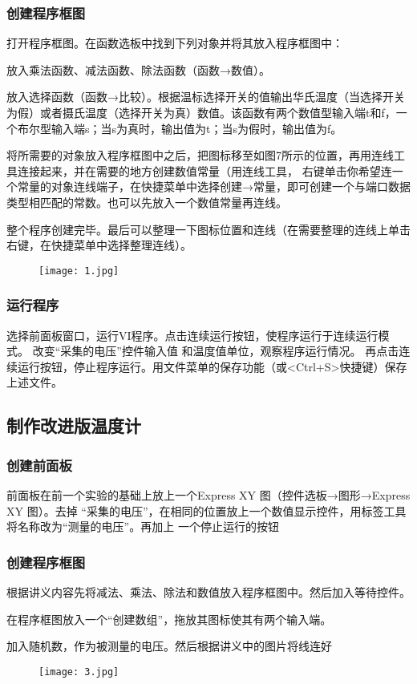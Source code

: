 \documentclass[12pt,a4paper]{article}
\begin{document}
    \subsubsection{创建程序框图}
    打开程序框图。在函数选板中找到下列对象并将其放入程序框图中：\par
    放入乘法函数、减法函数、除法函数（函数→数值）。\par
    放入选择函数（函数→比较）。根据温标选择开关的值输出华氏温度（当选择开关为假）或者摄氏温度（选择开关为真）数值。该函数有两个数值型输入端t和f，一个布尔型输入端s；当s为真时，输出值为t；当s为假时，输出值为f。\par
    将所需要的对象放入程序框图中之后，把图标移至如图7所示的位置，再用连线工具连接起来，并在需要的地方创建数值常量（用连线工具，
    右键单击你希望连一个常量的对象连线端子，在快捷菜单中选择创建→常量，即可创建一个与端口数据类型相匹配的常数。也可以先放入一个数值常量再连线。\par
    整个程序创建完毕。最后可以整理一下图标位置和连线（在需要整理的连线上单击右键，在快捷菜单中选择整理连线）。\par
    
    \begin{figure}[H]
        \centering
        \texttt{[image: 1.jpg]}
    \end{figure}
    \subsubsection{运行程序}
    选择前面板窗口，运行VI程序。点击连续运行按钮，使程序运行于连续运行模式。
    改变“采集的电压”控件输入值
    和温度值单位，观察程序运行情况。
    再点击连续运行按钮，停止程序运行。用文件菜单的保存功能（或<Ctrl+S>快捷键）保存上述文件。

    \subsection{制作改进版温度计}
    \subsubsection{创建前面板}
    前面板在前一个实验的基础上放上一个Express XY 图（控件选板→图形→Express XY 图）。去掉
    “采集的电压”，在相同的位置放上一个数值显示控件，用标签工具将名称改为“测量的电压”。再加上
    一个停止运行的按钮

    \subsubsection{创建程序框图}
    根据讲义内容先将减法、乘法、除法和数值放入程序框图中。然后加入等待控件。\par
    在程序框图放入一个“创建数组”，拖放其图标使其有两个输入端。\par
    加入随机数，作为被测量的电压。然后根据讲义中的图片将线连好
    \begin{figure}[H]
        \centering
        \texttt{[image: 3.jpg]}
    \end{figure}
\end{document}
